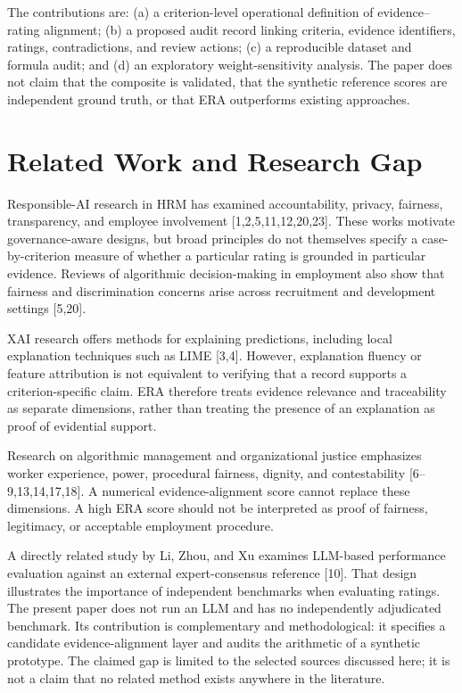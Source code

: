 \documentclass[
  10pt,
  a4paper,
  runningheads]{llncs}
\begin{document}
The contributions are: (a) a criterion-level operational definition of
evidence--rating alignment; (b) a proposed audit record linking
criteria, evidence identifiers, ratings, contradictions, and review
actions; (c) a reproducible dataset and formula audit; and (d) an
exploratory weight-sensitivity analysis. The paper does not claim that
the composite is validated, that the synthetic reference scores are
independent ground truth, or that ERA outperforms existing approaches.

\section{Related Work and Research
Gap}\label{related-work-and-research-gap}

Responsible-AI research in HRM has examined accountability, privacy,
fairness, transparency, and employee involvement
{[}1,2,5,11,12,20,23{]}. These works motivate governance-aware designs,
but broad principles do not themselves specify a case-by-criterion
measure of whether a particular rating is grounded in particular
evidence. Reviews of algorithmic decision-making in employment also show
that fairness and discrimination concerns arise across recruitment and
development settings {[}5,20{]}.

XAI research offers methods for explaining predictions, including local
explanation techniques such as LIME {[}3,4{]}. However, explanation
fluency or feature attribution is not equivalent to verifying that a
record supports a criterion-specific claim. ERA therefore treats
evidence relevance and traceability as separate dimensions, rather than
treating the presence of an explanation as proof of evidential support.

Research on algorithmic management and organizational justice emphasizes
worker experience, power, procedural fairness, dignity, and
contestability {[}6--9,13,14,17,18{]}. A numerical evidence-alignment
score cannot replace these dimensions. A high ERA score should not be
interpreted as proof of fairness, legitimacy, or acceptable employment
procedure.

A directly related study by Li, Zhou, and Xu examines LLM-based
performance evaluation against an external expert-consensus reference
{[}10{]}. That design illustrates the importance of independent
benchmarks when evaluating ratings. The present paper does not run an
LLM and has no independently adjudicated benchmark. Its contribution is
complementary and methodological: it specifies a candidate
evidence-alignment layer and audits the arithmetic of a synthetic
prototype. The claimed gap is limited to the selected sources discussed
here; it is not a claim that no related method exists anywhere in the
literature.
\end{document}
